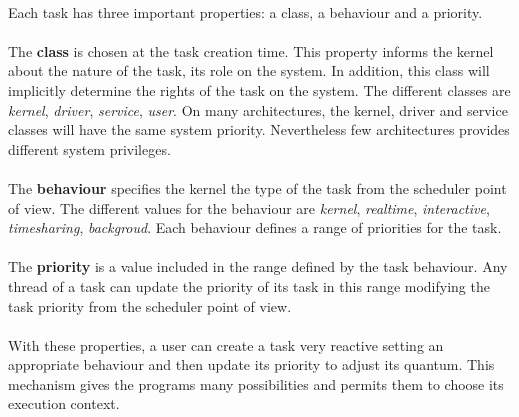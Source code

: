 \documentclass[10pt,a4wide]{article}
\begin{document}
\begin{multicols}{2}
\begin{enumerate}
\end{enumerate}

\paragraph{}

Each task has three important properties: a class, a behaviour and a priority.

\paragraph{}

The \textbf{class} is chosen at the task creation time. This property
informs the kernel about the nature of the task, its role on the system.
In addition, this class will implicitly determine the rights of the task
on the system. The different classes are \textit{kernel}, \textit{driver},
\textit{service}, \textit{user}. On many architectures, the kernel, driver
and service classes will have the same system priority. Nevertheless few
architectures provides different system privileges.

\paragraph{}

The \textbf{behaviour} specifies the kernel the type of the task from the
scheduler point of view. The different values for the behaviour are
\textit{kernel}, \textit{realtime}, \textit{interactive}, \textit{timesharing},
\textit{backgroud}. Each behaviour defines a range of priorities for the
task.

\paragraph{}

The \textbf{priority} is a value included in the range defined by the
task behaviour. Any thread of a task can update the priority of its
task in this range modifying the task priority from the scheduler point of view.

\paragraph{}

With these properties, a user can create a task very reactive setting an
appropriate behaviour and then update its priority to adjust its quantum.
This mechanism gives the programs many possibilities and permits them to
choose its execution context.


\end{multicols}
\end{document}
